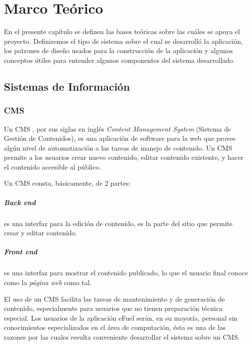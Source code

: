 \chapter{Marco Teórico}
En el presente capítulo se definen las bases teóricas sobre las cuáles se apoya el proyecto. Definiremos el tipo de sistema sobre el cual se desarrolló la aplicación, los patrones de diseño usados para la construcción de la aplicación y algunos conceptos útiles para entender algunos componentes del sistema desarrollado.

\section{Sistemas de Información}
    \subsection{CMS}
    Un CMS \cite{cmsBarker}, por sus siglas en inglés \textit{Content Management System} (Sistema de Gestión de Contenidos), es una aplicación de software para la web que provee algún nivel de automatización a las tareas de manejo de contenido. Un CMS permite a los usuarios crear nuevo contenido, editar contenido existente, y hacer el contenido accesible al público.

    Un CMS consta, básicamente, de 2 partes:
    
    \paragraph*{Back end} \label{backEndCMS} es una interfaz para la edición de contenido, es la parte del sitio que permite crear y editar contenido.
    \paragraph*{Front end} es una interfaz para mostrar el contenido publicado, lo que el usuario final conoce como la \emph{página web} como tal.

    El uso de un CMS facilita las tareas de mantenimiento y de generación de contenido, especialmente para usuarios que no tienen preparación técnica especial. Los usuarios de la aplicación eFuel serán, en su mayoría, personal sin conocimientos especializados en el área de computación, ésta es una de las razones por las cuales resulta conveniente desarrollar el sistema sobre un CMS.

